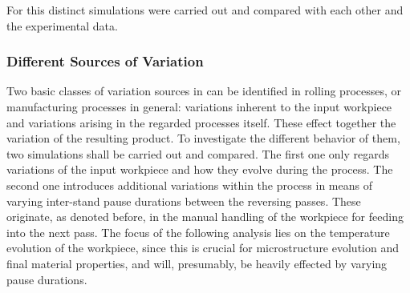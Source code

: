 For this distinct simulations were carried out and compared with each other and the experimental data.

\subsubsection{Different Sources of Variation}\label{subsubsec:different-sources-of-variation}

Two basic classes of variation sources in can be identified in rolling processes, or manufacturing processes in general: variations inherent to the input workpiece and variations arising in the regarded processes itself.
These effect together the variation of the resulting product.
To investigate the different behavior of them, two simulations shall be carried out and compared.
The first one only regards variations of the input workpiece and how they evolve during the process.
The second one introduces additional variations within the process in means of varying inter-stand pause durations between the reversing passes.
These originate, as denoted before, in the manual handling of the workpiece for feeding into the next pass.
The focus of the following analysis lies on the temperature evolution of the workpiece, since this is crucial for microstructure evolution and final material properties, and will, presumably, be heavily effected by varying pause durations.

